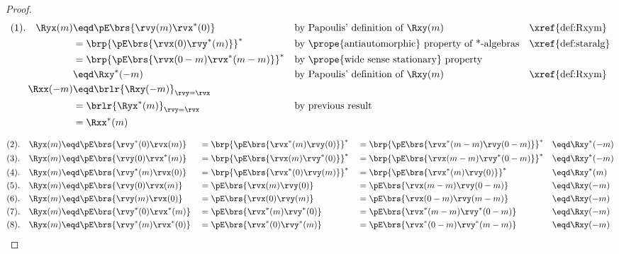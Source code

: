 \begin{proof}
\begin{align*}
    (1).\quad\Ryx(m)
      &\eqd \pE\brs{\rvy(m)\rvx^\ast(0)}
      && \text{by Papoulis' definition of $\Rxy(m)$}                           && \text{\xref{def:Rxym}}
    \\&= \brp{\pE\brs{\rvx(0)\rvy^\ast(m)}}^\ast
      && \text{by \prope{antiautomorphic} property of *-algebras}              && \text{\xref{def:staralg}}
    \\&= \brp{\pE\brs{\rvx(0-m)\rvx^\ast(m-m)}}^\ast
      && \text{by \prope{wide sense stationary} property}
    \\&\eqd \Rxy^\ast(-m)
      && \text{by Papoulis' definition of $\Rxy(m)$}                           && \text{\xref{def:Rxym}}
    \\
    \Rxx(-m)
      &\eqd \brlr{\Rxy(-m)}_{\rvy=\rvx}
    \\&= \brlr{\Ryx^\ast(m)}_{\rvy=\rvx}
      && \text{by previous result}
    \\&= \Rxx^\ast(m)
\end{align*}

\begin{align*}
    (2).\quad\Ryx(m)
      &\eqd \pE\brs{\rvy^\ast(0)\rvx(m)}
     &&=\brp{\pE\brs{\rvx^\ast(m)\rvy(0)}}^\ast
     &&=\brp{\pE\brs{\rvx^\ast(m-m)\rvy(0-m)}}^\ast
     &&\eqd \Rxy^\ast(-m)
    \\
    (3).\quad\Ryx(m)
      &\eqd \pE\brs{\rvy(0)\rvx^\ast(m)}
     &&=\brp{\pE\brs{\rvx(m)\rvy^\ast(0)}}^\ast
     &&=\brp{\pE\brs{\rvx(m-m)\rvy^\ast(0-m)}}^\ast
     &&\eqd \Rxy^\ast(-m)
    \\
    (4).\quad\Ryx(m)
      &\eqd \pE\brs{\rvy^\ast(m)\rvx(0)}
     &&=\brp{\pE\brs{\rvx^\ast(0)\rvy(m)}}^\ast
     &&=\brp{\pE\brs{\rvx^\ast(m)\rvy(0)}}^\ast
     &&\eqd \Rxy^\ast(m)
    \\
    (5).\quad\Ryx(m)
      &\eqd  \pE\brs{\rvy(0)\rvx(m)}
     &&=     \pE\brs{\rvx(m)\rvy(0)}
     &&=     \pE\brs{\rvx(m-m)\rvy(0-m)}
     &&\eqd \Rxy(-m)
    \\
    (6).\quad\Ryx(m)
      &\eqd  \pE\brs{\rvy(m)\rvx(0)}
     &&=     \pE\brs{\rvx(0)\rvy(m)}
     &&=     \pE\brs{\rvx(0-m)\rvy(m-m)}
     &&\eqd \Rxy(-m)
    \\
    (7).\quad\Ryx(m)
      &\eqd  \pE\brs{\rvy^\ast(0)\rvx^\ast(m)}
     &&=     \pE\brs{\rvx^\ast(m)\rvy^\ast(0)}
     &&=     \pE\brs{\rvx^\ast(m-m)\rvy^\ast(0-m)}
     &&\eqd \Rxy(-m)
    \\
    (8).\quad\Ryx(m)
      &\eqd  \pE\brs{\rvy^\ast(m)\rvx^\ast(0)}
     &&=     \pE\brs{\rvx^\ast(0)\rvy^\ast(m)}
     &&=     \pE\brs{\rvx^\ast(0-m)\rvy^\ast(m-m)}
     &&\eqd \Rxy(-m)
\end{align*}

\end{proof}

